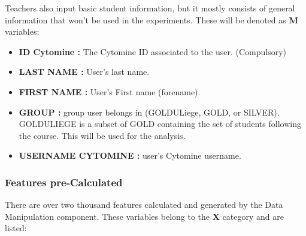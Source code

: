\documentclass[a4paper,11pt]{report}
\numberwithin{figure}{section} %
\begin{document}
    Teachers also input basic student information, but it mostly consists of general information that won't be used in the experiments.
    These will be denoted as \textbf{M} variables:
   	\begin{itemize}
   	\item[\textbullet] \textbf{ID Cytomine :} The Cytomine ID associated to the user. (Compulsory)
    \item[\textbullet] \textbf{LAST NAME :} User's last name.
    \item[\textbullet] \textbf{FIRST NAME :} User's First name (forename).
    \item[\textbullet] \textbf{GROUP :} group user belongs in (GOLDULiege, GOLD, or SILVER).
    GOLDULIEGE is a subset of GOLD containing the set of students following the course.
    This will be used for the analysis.
    \item[\textbullet] \textbf{USERNAME CYTOMINE :} user's Cytomine username.
   	\end{itemize}
    
    
    \subsubsection{Features pre-Calculated}
    
    There are over two thousand features calculated and generated by the Data Manipulation component.
    These variables belong to the \textbf{X} category and are listed:
   
\end{document}

